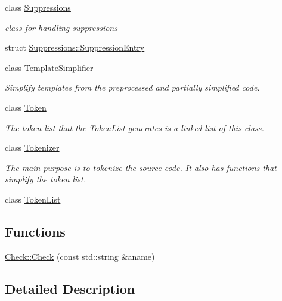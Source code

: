 \begin{DoxyCompactItemize}
class \hyperlink{class_suppressions}{Suppressions}
\begin{DoxyCompactList}\small\item\em class for handling suppressions \end{DoxyCompactList}\item 
struct \hyperlink{struct_suppressions_1_1_suppression_entry}{Suppressions\-::\-Suppression\-Entry}
\item 
class \hyperlink{class_template_simplifier}{Template\-Simplifier}
\begin{DoxyCompactList}\small\item\em Simplify templates from the preprocessed and partially simplified code. \end{DoxyCompactList}\item 
class \hyperlink{class_token}{Token}
\begin{DoxyCompactList}\small\item\em The token list that the \hyperlink{class_token_list}{Token\-List} generates is a linked-\/list of this class. \end{DoxyCompactList}\item 
class \hyperlink{class_tokenizer}{Tokenizer}
\begin{DoxyCompactList}\small\item\em The main purpose is to tokenize the source code. It also has functions that simplify the token list. \end{DoxyCompactList}\item 
class \hyperlink{class_token_list}{Token\-List}
\end{DoxyCompactItemize}
\subsection*{Functions}
\begin{DoxyCompactItemize}
\item 
\hyperlink{group___core_ga0cb366bed825a49e45cce28335f75efb}{Check\-::\-Check} (const std\-::string \&aname)
\end{DoxyCompactItemize}


\subsection{Detailed Description}


